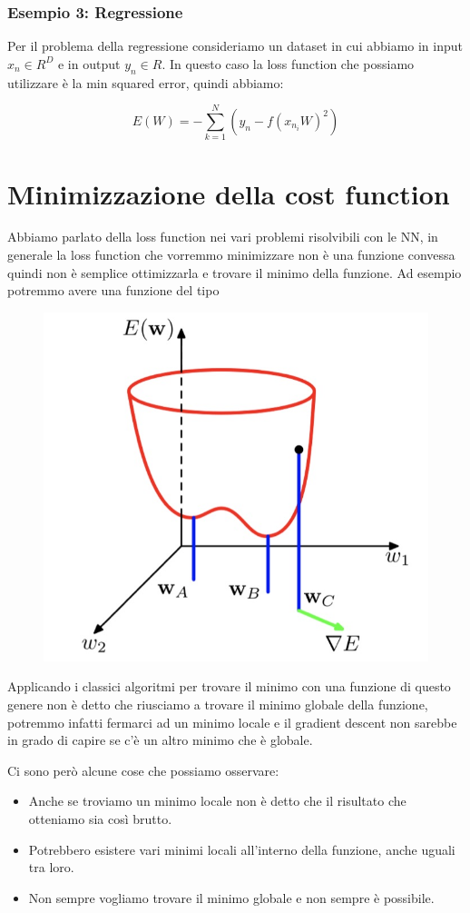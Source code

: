 \documentclass[14pt]{extreport}
\begin{document}
\subsubsection{Esempio 3: Regressione}

Per il problema della regressione consideriamo un dataset in cui abbiamo in input $x_n \in R^D$ e in output $y_n \in R$. In questo caso la loss
function che possiamo utilizzare è la min squared error, quindi abbiamo:

$$E(W) = -\sum_{k=1}^N(y_n-f(x_{n_{i}} W)^2)$$ 

\section{Minimizzazione della cost function}

Abbiamo parlato della loss function nei vari problemi risolvibili con le NN, in generale la loss function che vorremmo minimizzare non è una funzione
convessa quindi non è semplice ottimizzarla e trovare il minimo della funzione. Ad esempio potremmo avere una funzione del tipo

\begin{figure}[H]
\centering
\includegraphics[width=0.4\linewidth]{377.jpeg}
\end{figure}

Applicando i classici algoritmi per trovare il minimo con una funzione di questo genere non è detto che riusciamo a trovare il minimo globale della
funzione, potremmo infatti fermarci ad un minimo locale e il gradient descent non sarebbe in grado di capire se c'è un altro minimo che è globale.

Ci sono però alcune cose che possiamo osservare:
\begin{itemize}
\item Anche se troviamo un minimo locale non è detto che il risultato che otteniamo sia così brutto.
\item Potrebbero esistere vari minimi locali all'interno della funzione, anche uguali tra loro.
\item Non sempre vogliamo trovare il minimo globale e non sempre è possibile.
\end{itemize}
\end{document}
